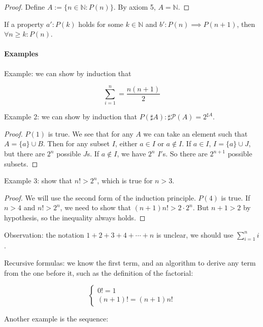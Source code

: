 \documentclass[12pt,a4paper]{report}
\numberwithin{equation}{section}
\theoremstyle{definition}
\theoremstyle{remark}
\begin{document}
\begin{proof}
Define $A := \lbrace n \in \mathbb{N}: P(n) \rbrace$. By axiom 5, $A = \mathbb{N}$.
\end{proof}

If a property $a': P(k)$ holds for some $k \in \mathbb{N}$ and $b': P(n) \implies P(n+1)$, then $\forall n \geq k : P(n)$.

\paragraph{Examples}

Example: we can show by induction that

\begin{equation}
\sum_{i=1}^n = \frac{n (n+1)}{2}
\end{equation}

Example 2: we can show by induction that $P(\sharp A):\sharp \mathcal{P}(A) = 2^{\sharp A}$. 

\begin{proof}
$P(1)$ is true. 
We see that for any $A$ we can take an element such that $A = \lbrace a \rbrace \cup B$. Then for any subset $I$, either $a \in I$ or $a \not \in I$. If $a \in I$, $I = \lbrace a \rbrace \cup J$, but there are $2^n$ possible $J$s. If $a \not \in I$, we have $2^n$ $I'$s. So there are $2^{n+1}$ possible subsets.
\end{proof}

Example 3: show that $n! > 2^n$, which is true for $n>3$.

\begin{proof}
We will use the second form of the induction principle. $P(4)$ is true. If $n>4$ and $n! > 2^n$, we need to show that $(n+1) n!> 2 \cdot 2^n$. But $n+1>2$ by hypothesis, so the inequality always holds.
\end{proof}

Observation: the notation $1 + 2+ 3 + 4+ \cdots + n$ is unclear, we should use $\sum_{i=1}^n i$.

Recursive formulas: we know the first term, and an algorithm to derive any term from the one before it, such as the definition of the factorial:

\begin{equation}
\begin{cases}
0! = 1\\
(n+1)! = (n+1) n!
\end{cases}
\end{equation}

Another example is the sequence:
\end{document}
